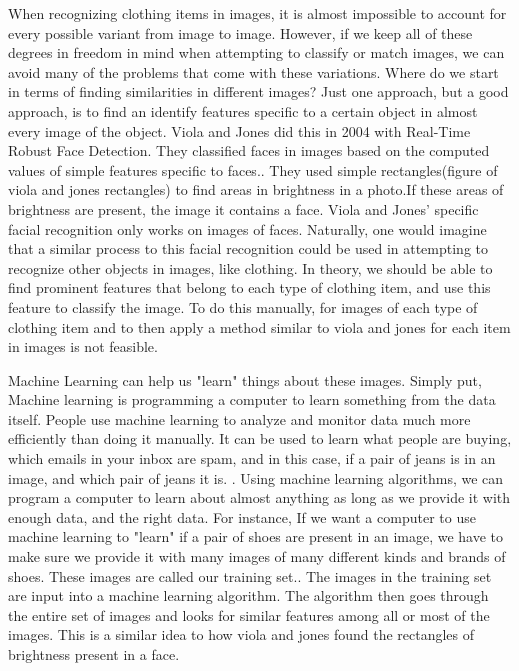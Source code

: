\documentclass[12pt]{article} %
\begin{document}
	When recognizing clothing items in images, it is almost impossible to account for every possible variant from image to image. However, if we keep all of these degrees in freedom in mind when attempting to classify or match images, we can avoid many of the problems that come with these variations. Where do we start in terms of finding similarities in different images? Just one approach, but a good approach, is to find an identify features specific to a certain object in almost every image of the object. Viola and Jones did this in 2004 with Real-Time Robust Face Detection. They classified faces in images based on the computed values of simple features specific to faces.\cite{viola2004robust}. They used simple rectangles(figure of viola and jones rectangles) to find areas in brightness in a photo.If these areas of brightness are present, the image it contains a face. Viola and Jones' specific facial recognition only works on images of faces. Naturally, one would imagine that a similar process to this facial recognition could be used in attempting to recognize other objects in images, like clothing. In theory, we should be able to find prominent features that belong to each type of clothing item, and use this feature to classify the image. To do this manually, for images of each type of clothing item and to then apply a method similar to viola and jones for each item in images is not feasible. 
	
Machine Learning can help us "learn" things about these images. Simply put, Machine learning is programming a computer to learn something from the data itself. People use machine learning to analyze and monitor data much more efficiently than doing it manually. It can be used to learn what people are buying, which emails in your inbox are spam, and in this case, if a pair of jeans is in an image, and which pair of jeans it is. \cite{aurelienMachineLearning}. Using machine learning algorithms, we can program a computer to learn about almost anything as long as we provide it with enough data, and the right data. For instance, If we want a computer to use machine learning to "learn" if a pair of shoes are present in an image, we have to make sure we provide it with many images of many different kinds and brands of shoes. These images are called our training set.\cite{aurelienMachineLearning}. The images in the training set are input into a machine learning algorithm. The algorithm then goes through the entire set of images and looks for similar features among all or most of the images. This is a similar idea to how viola and jones found the rectangles of brightness present in a face.\cite{viola2004robust} 
\end{document}
